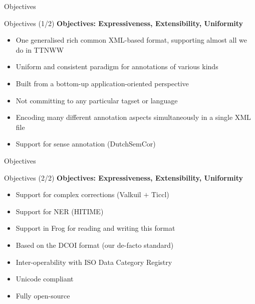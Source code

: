 \documentclass[compress]{beamer}
\begin{document}
\begin{frame}{Objectives}
    \begin{block}{Objectives (1/2)}
        \textbf{Objectives: Expressiveness, Extensibility, Uniformity}
        \begin{itemize}        
            \item One generalised rich common XML-based format, supporting almost all we do in TTNWW
            \item Uniform and consistent paradigm for annotations of various kinds
            \item Built from a bottom-up application-oriented perspective            
            \item Not committing to any particular tagset or language            
            \item Encoding many different annotation aspects simultaneously in a single XML file
            \item Support for sense annotation (DutchSemCor)
        \end{itemize}        
    \end{block}
\end{frame}
            

\begin{frame}{Objectives}
    \begin{block}{Objectives (2/2)}
        \textbf{Objectives: Expressiveness, Extensibility, Uniformity}
        \begin{itemize}                    
            \item Support for complex corrections (Valkuil $+$ Ticcl)
            \item Support for NER (HITIME)
            \item Support in Frog for reading and writing this format            
            \item Based on the DCOI format (our de-facto standard)
            \item Inter-operability with ISO Data Category Registry
            \item Unicode compliant
            \item Fully open-source
        \end{itemize}        
    \end{block}
\end{frame}
\end{document}
